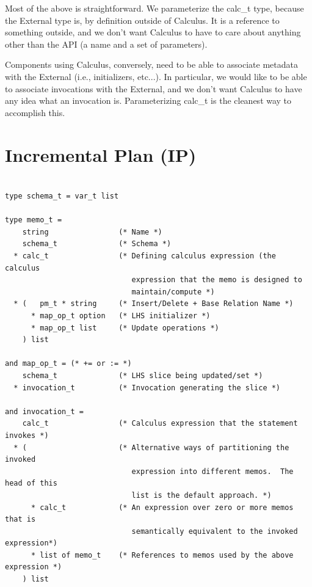 \documentclass[11pt]{amsart}
\begin{document}
Most of the above is straightforward.  We parameterize the calc\_t type, because  the External type is, by definition outside of Calculus.  It is a reference to something outside, and we don't want Calculus to have to care about anything other than the API (a name and a set of parameters).  

Components using Calculus, conversely, need to be able to associate metadata with the External (i.e., initializers, etc...).  In particular, we would like to be able to associate invocations with the External, and we don't want Calculus to have any idea what an invocation is.  Parameterizing calc\_t is the cleanest way to accomplish this.

\section{Incremental Plan (IP)}


\begin{verbatim}

type schema_t = var_t list

type memo_t = 
    string                (* Name *)
    schema_t              (* Schema *)
  * calc_t                (* Defining calculus expression (the calculus 
                             expression that the memo is designed to 
                             maintain/compute *)
  * (   pm_t * string     (* Insert/Delete + Base Relation Name *)
      * map_op_t option   (* LHS initializer *)
      * map_op_t list     (* Update operations *)
    ) list

and map_op_t = (* += or := *)
    schema_t              (* LHS slice being updated/set *)
  * invocation_t          (* Invocation generating the slice *)

and invocation_t =
    calc_t                (* Calculus expression that the statement invokes *)
  * (                     (* Alternative ways of partitioning the invoked 
                             expression into different memos.  The head of this
                             list is the default approach. *)
      * calc_t            (* An expression over zero or more memos that is 
                             semantically equivalent to the invoked expression*)
      * list of memo_t    (* References to memos used by the above expression *)
    ) list

\end{verbatim}
\end{document}
